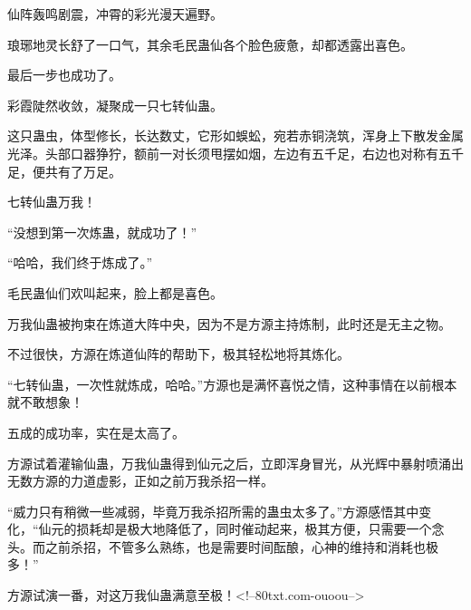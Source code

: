 \begin{this_body}
仙阵轰鸣剧震，冲霄的彩光漫天遍野。

琅琊地灵长舒了一口气，其余毛民蛊仙各个脸色疲惫，却都透露出喜色。

最后一步也成功了。

彩霞陡然收敛，凝聚成一只七转仙蛊。

这只蛊虫，体型修长，长达数丈，它形如蜈蚣，宛若赤铜浇筑，浑身上下散发金属光泽。头部口器狰狞，额前一对长须甩摆如烟，左边有五千足，右边也对称有五千足，便共有了万足。

七转仙蛊万我！

“没想到第一次炼蛊，就成功了！”

“哈哈，我们终于炼成了。”

毛民蛊仙们欢叫起来，脸上都是喜色。

万我仙蛊被拘束在炼道大阵中央，因为不是方源主持炼制，此时还是无主之物。

不过很快，方源在炼道仙阵的帮助下，极其轻松地将其炼化。

“七转仙蛊，一次性就炼成，哈哈。”方源也是满怀喜悦之情，这种事情在以前根本就不敢想象！

五成的成功率，实在是太高了。

方源试着灌输仙蛊，万我仙蛊得到仙元之后，立即浑身冒光，从光辉中暴射喷涌出无数方源的力道虚影，正如之前万我杀招一样。

“威力只有稍微一些减弱，毕竟万我杀招所需的蛊虫太多了。”方源感悟其中变化，“仙元的损耗却是极大地降低了，同时催动起来，极其方便，只需要一个念头。而之前杀招，不管多么熟练，也是需要时间酝酿，心神的维持和消耗也极多！”

方源试演一番，对这万我仙蛊满意至极！<!--80txt.com-ouoou-->

\end{this_body}

